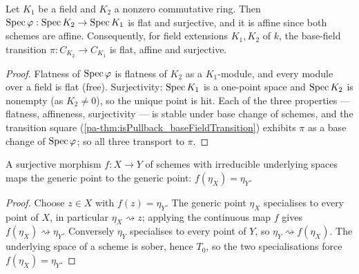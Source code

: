 \begin{lemma}
  \label{pa-lem:baseFieldTransition_flat_affine_surjective}
  \leanok

  Let \(K_1\) be a field and \(K_2\) a nonzero commutative ring. Then
  \(\operatorname{Spec}\varphi : \operatorname{Spec} K_2 \to \operatorname{Spec} K_1\) is flat and surjective, and it is affine
  since both schemes are affine. Consequently, for field extensions \(K_1, K_2\) of
  \(k\), the base-field transition \(\pi : C_{K_2} \to C_{K_1}\) is flat, affine and
  surjective.
\end{lemma}
\begin{proof}
  \leanok
  Flatness of \(\operatorname{Spec}\varphi\) is flatness of \(K_2\) as a \(K_1\)-module, and every
  module over a field is flat (free). Surjectivity: \(\operatorname{Spec} K_1\) is a one-point space
  and \(\operatorname{Spec} K_2\) is nonempty (as \(K_2 \neq 0\)), so the unique point is hit. Each of
  the three properties --- flatness, affineness, surjectivity --- is stable under base
  change of schemes, and the transition square
  (\ref{pa-thm:isPullback_baseFieldTransition}) exhibits \(\pi\) as a base change of
  \(\operatorname{Spec}\varphi\); so all three transport to \(\pi\).
\end{proof}

\begin{lemma}
  \label{pa-lem:genericPoint_eq_of_surjective}
  \leanok

  A surjective morphism \(f : X \to Y\) of schemes with irreducible underlying spaces
  maps the generic point to the generic point: \(f(\eta_X) = \eta_Y\).
\end{lemma}
\begin{proof}
  \leanok
  Choose \(z \in X\) with \(f(z) = \eta_Y\). The generic point \(\eta_X\) specialises to
  every point of \(X\), in particular \(\eta_X \rightsquigarrow z\); applying the
  continuous map \(f\) gives \(f(\eta_X) \rightsquigarrow \eta_Y\). Conversely
  \(\eta_Y\) specialises to every point of \(Y\), so
  \(\eta_Y \rightsquigarrow f(\eta_X)\). The underlying space of a scheme is sober,
  hence \(T_0\), so the two specialisations force \(f(\eta_X) = \eta_Y\).
\end{proof}

